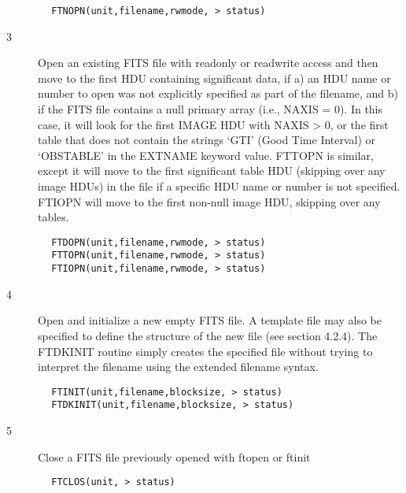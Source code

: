 \documentclass[11pt]{book}
\begin{document}
\begin{verbatim}
        FTNOPN(unit,filename,rwmode, > status)
\end{verbatim}

\begin{description}
\item[3 ]Open an existing FITS file with readonly or readwrite access
   and then move to the first HDU containing significant data, if a) an HDU
   name or number to open was not explicitly specified as part of the
   filename, and b) if the FITS file contains a null primary array (i.e.,
   NAXIS = 0).  In this case, it will look for the first IMAGE HDU with
   NAXIS > 0, or the first table that does not contain the strings `GTI'
   (Good Time Interval) or `OBSTABLE' in the EXTNAME keyword value.  FTTOPN
   is similar, except it will move to the first significant table HDU
   (skipping over any image HDUs) in the file if a specific HDU name
   or number is not specified.  FTIOPN will move to the first non-null
  image HDU, skipping over any tables.
\end{description}

\begin{verbatim}
        FTDOPN(unit,filename,rwmode, > status)
        FTTOPN(unit,filename,rwmode, > status)
        FTIOPN(unit,filename,rwmode, > status)
\end{verbatim}

\begin{description}
\item[4 ]Open and initialize a new empty FITS file.   A template file may also be
   specified to define the structure of the new file (see section 4.2.4).
   The FTDKINIT routine simply creates the specified
   file without trying to interpret the filename using the extended
  filename syntax.
\end{description}

\begin{verbatim}
        FTINIT(unit,filename,blocksize, > status)
        FTDKINIT(unit,filename,blocksize, > status)
\end{verbatim}

\begin{description}
\item[5 ]Close a FITS file previously opened with ftopen or ftinit
\end{description}

\begin{verbatim}
        FTCLOS(unit, > status)
\end{verbatim}
\end{document}
